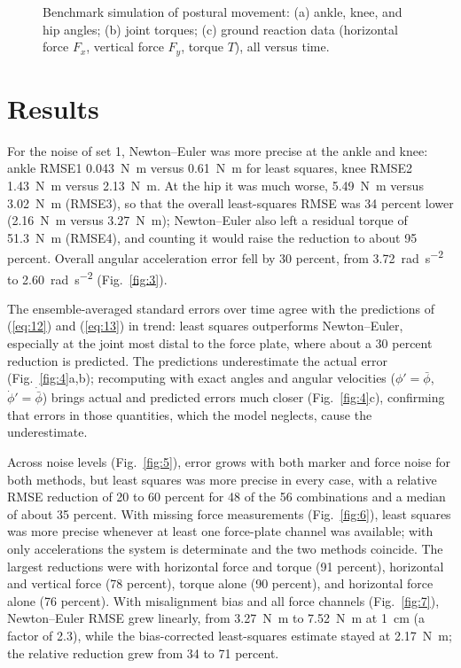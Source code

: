\documentclass[11pt]{article}
\begin{document}
\begin{figure}[t]
\centering
{}
\caption{Benchmark simulation of postural movement: (a) ankle, knee, and hip
angles; (b) joint torques; (c) ground reaction data (horizontal force $F_x$,
vertical force $F_y$, torque $T$), all versus time.}
\label{fig:2}
\end{figure}

\section*{Results}

For the noise of set 1, Newton--Euler was more precise at the ankle and knee:
ankle RMSE1 \SI{0.043}{\newton\metre} versus \SI{0.61}{\newton\metre} for
least squares, knee RMSE2 \SI{1.43}{\newton\metre} versus
\SI{2.13}{\newton\metre}. At the hip it was much worse,
\SI{5.49}{\newton\metre} versus \SI{3.02}{\newton\metre} (RMSE3), so that the
overall least-squares RMSE was 34 percent lower (\SI{2.16}{\newton\metre}
versus \SI{3.27}{\newton\metre}); Newton--Euler also left a residual torque of
\SI{51.3}{\newton\metre} (RMSE4), and counting it would raise the reduction to
about 95 percent. Overall angular acceleration error fell by 30 percent, from
\SI{3.72}{\radian\per\second\squared} to \SI{2.60}{\radian\per\second\squared}
(Fig.~\ref{fig:3}).

The ensemble-averaged standard errors over time agree with the predictions of
(\ref{eq:12}) and (\ref{eq:13}) in trend: least squares outperforms
Newton--Euler, especially at the joint most distal to the force plate, where
about a 30 percent reduction is predicted. The predictions underestimate the
actual error (Fig.~\ref{fig:4}a,b); recomputing with exact angles and angular
velocities ($\phi'=\bar{\phi}$, $\dot{\phi}'=\dot{\bar{\phi}}$) brings actual
and predicted errors much closer (Fig.~\ref{fig:4}c), confirming that errors in
those quantities, which the model neglects, cause the underestimate.

Across noise levels (Fig.~\ref{fig:5}), error grows with both marker and force
noise for both methods, but least squares was more precise in every case,
with a relative RMSE reduction of 20 to 60 percent for 48 of the 56
combinations and a median of about 35 percent. With missing force
measurements (Fig.~\ref{fig:6}), least squares was more precise whenever at
least one force-plate channel was available; with only accelerations the
system is determinate and the two methods coincide. The largest reductions
were with horizontal force and torque (91 percent), horizontal and vertical
force (78 percent), torque alone (90 percent), and horizontal force alone
(76 percent). With misalignment bias and all force channels
(Fig.~\ref{fig:7}), Newton--Euler RMSE grew linearly, from
\SI{3.27}{\newton\metre} to \SI{7.52}{\newton\metre} at \SI{1}{\centi\metre}
(a factor of 2.3), while the bias-corrected least-squares estimate stayed at
\SI{2.17}{\newton\metre}; the relative reduction grew from 34 to 71 percent.
\end{document}

